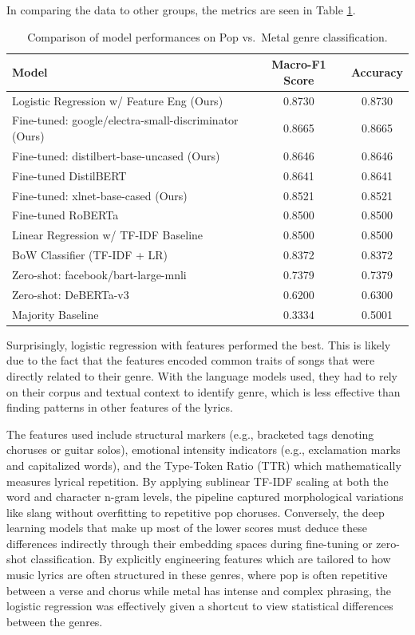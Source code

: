 In comparing the data to other groups, the metrics are seen in Table \ref{model-results}.

\begin{table}[h]
  \centering
  \begin{tabular}{l c c}
    \hline
    \textbf{Model} & \textbf{Macro-F1 Score} & \textbf{Accuracy} \\
    \hline
    Logistic Regression w/ Feature Eng (Ours) & 0.8730 & 0.8730 \\
    Fine-tuned: google/electra-small-discriminator (Ours) & 0.8665 & 0.8665 \\
    Fine-tuned: distilbert-base-uncased (Ours) & 0.8646 & 0.8646 \\
    Fine-tuned DistilBERT & 0.8641 & 0.8641 \\
    Fine-tuned: xlnet-base-cased (Ours) & 0.8521 & 0.8521 \\
    Fine-tuned RoBERTa & 0.8500 & 0.8500 \\
    Linear Regression w/ TF-IDF Baseline & 0.8500 & 0.8500 \\
    BoW Classifier (TF-IDF + LR) & 0.8372 & 0.8372 \\
    Zero-shot: facebook/bart-large-mnli & 0.7379 & 0.7379 \\
    Zero-shot: DeBERTa-v3 & 0.6200 & 0.6300 \\
    Majority Baseline & 0.3334 & 0.5001 \\
    \hline
  \end{tabular}
  \caption{\label{model-results}
    Comparison of model performances on Pop vs.\ Metal genre classification.
  }
\end{table}

Surprisingly, logistic regression with features performed the best.
This is likely due to the fact that the features encoded common traits of songs that were directly related to their genre.
With the language models used, they had to rely on their corpus and textual context to identify genre, which is less effective than finding patterns in other features of the lyrics.

The features used include structural markers (e.g., bracketed tags denoting choruses or guitar solos), emotional intensity indicators (e.g., exclamation marks and capitalized words), and the Type-Token Ratio (TTR) which mathematically measures lyrical repetition.
By applying sublinear TF-IDF scaling at both the word and character n-gram levels, the pipeline captured morphological variations like slang without overfitting to repetitive pop choruses.
Conversely, the deep learning models that make up most of the lower scores must deduce these differences indirectly through their embedding spaces during fine-tuning or zero-shot classification.
By explicitly engineering features which are tailored to how music lyrics are often structured in these genres, where pop is often repetitive between a verse and chorus while metal has intense and complex phrasing, the logistic regression was effectively given a shortcut to view statistical differences between the genres.

